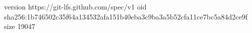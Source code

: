 version https://git-lfs.github.com/spec/v1
oid sha256:1b746502c35f64a134532afa151b40eba3c9ba3a5b52cfa11ce7bc5a84d2ce9f
size 19047
